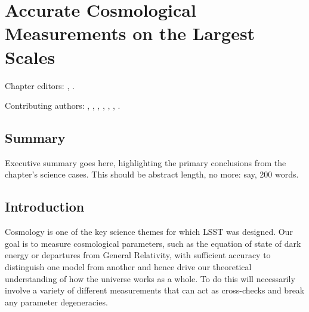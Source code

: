 
\chapter[Cosmology]{Accurate Cosmological Measurements on the Largest Scales}
\def\chpname{cosmo}\label{chp:\chpname}

Chapter editors:
,
.

Contributing authors:
,
,
,
,
,
,
.


\section*{Summary}

Executive summary goes here, highlighting the primary conclusions from
the chapter's science cases. This should be abstract length, no more:
say, 200 words.


\section{Introduction}
\label{sec:\chpname:intro}

Cosmology is one of the key science themes for which LSST was
designed. Our goal is to measure cosmological parameters, such as the
equation of state of dark energy or departures from General
Relativity, with sufficient accuracy to distinguish one model from
another and hence drive our theoretical understanding of how the
universe works as a whole. To do this will necessarily involve a
variety of different measurements that can act as cross-checks and break
any parameter degeneracies.

